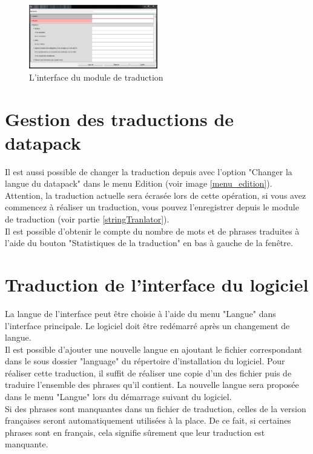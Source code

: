 \begin{figure}[h!]
\centering
\includegraphics[width=0.5\textwidth]{images/translator.png}
\caption{L'interface du module de traduction}
\end{figure}


\section{Gestion des traductions de datapack}

Il est aussi possible de changer la traduction depuis \tria avec l'option "Changer la langue du datapack" dans le menu Edition (voir image \ref{menu_edition}). Attention, la traduction actuelle sera écrasée lors de cette opération, si vous avez commencez à réaliser un traduction, vous pouvez l'enregistrer depuis le module de traduction (voir partie \ref{stringTranlator}).\\

Il est possible d'obtenir le compte du nombre de mots et de phrases traduites à l'aide du bouton "Statistiques de la traduction" en bas à gauche de la fenêtre.\\

\section{Traduction de l'interface du logiciel}

La langue de l'interface peut être choisie à l'aide du menu "Langue" dans l'interface principale. Le logiciel doit être redémarré après un changement de langue.\\

Il est possible d'ajouter une nouvelle langue en ajoutant le fichier correspondant dans le sous dossier "language" du répertoire d'installation du logiciel. Pour réaliser cette traduction, il suffit de réaliser une copie d'un des fichier puis de traduire l'ensemble des phrases qu'il contient. La nouvelle langue sera proposée dans le menu "Langue" lors du démarrage suivant du logiciel.\\

Si des phrases sont manquantes dans un fichier de traduction, celles de la version françaises seront automatiquement utilisées à la place. De ce fait, si certaines phrases sont en français, cela signifie sûrement que leur traduction est manquante. 

